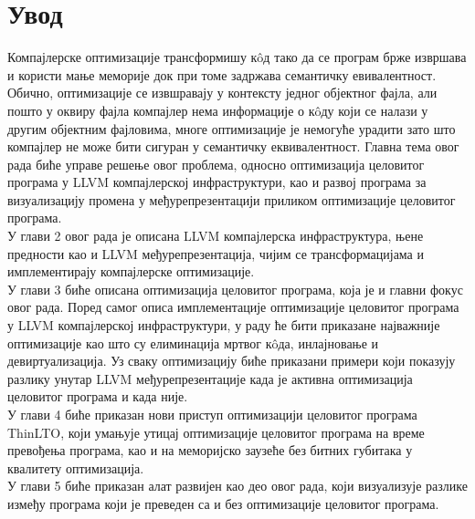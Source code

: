 \documentclass[12pt,oneside]{memoir}
\begin{document}
\frontmatter
\naslovna
\komisija
\tableofcontents*

\mainmatter

\chapter{Увод}

Компајлерске оптимизације трансформишу к\^{o}д тако да се програм брже извршава
и користи мање меморије док при томе задржава семантичку евивалентност.
Обично, оптимизације се извшравају у контексту једног објектног фајла, али
пошто у оквиру фајла компајлер нема информације о к\^{o}ду који се налази у 
другим објектним фајловима, многе оптимизације је немогуће урадити зато што компајлер
не може бити сигуран у семантичку еквивалентност.
Главна тема овог рада биће управе решење овог проблема, односно оптимизација
целовитог програма у LLVM компајлерској инфраструктури, као и развој програма
за визуализацију промена у међурепрезентацији приликом оптимизације
целовитог програма.
\\
У глави 2 овог рада је описана LLVM компајлерска инфраструктура, њене предности
као и LLVM међурепрезентација, чијим се трансформацијама и имплементирају
компајлерске оптимизације.
\\
У глави 3 биће описана оптимизација целовитог програма, која је и главни
фокус овог рада.
Поред самог описа имплементације оптимизације целовитог програма у 
LLVM компајлерској инфраструктури, у раду ће бити приказане најважније оптимизације
као што су елиминација мртвог к\^{o}да, инлајновање и девиртуализација.
Уз сваку оптимизацију биће приказани примери који показују разлику унутар 
LLVM међурепрезентације када је активна оптимизација целовитог програма
и када није.
\\
У глави 4 биће приказан нови приступ оптимизацији целовитог програма ThinLTO,
који умањује утицај оптимизације целовитог програма на време превођења програма,
као и на меморијско заузеће без битних губитака у квалитету оптимизација.
\\
У глави 5 биће приказан алат развијен као део овог рада, који визуализује разлике 
између програма који је преведен са и без оптимизације целовитог програма.
\end{document}
